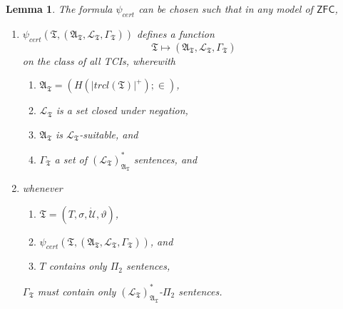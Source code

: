 \documentclass[12pt, twoside]{memoir}
\numberwithin{equation}{section}
\newtheorem{lem}[thm]{Lemma}
\theoremstyle{definition}
\theoremstyle{remark}
\theoremstyle{definition}
\theoremstyle{definition}
\theoremstyle{definition}
\theoremstyle{remark}
\begin{document}
\begin{lem}\label{mcequiv}
The formula $\psi_{cert}$ can be chosen such that in any model of $\mathsf{ZFC}$, 
\begin{enumerate}[label=(\alph*)]
    \item $\psi_{cert}(\mathfrak{T}, (\mathfrak{A}_{\mathfrak{T}}, \mathcal{L}_{\mathfrak{T}}, \Gamma_{\mathfrak{T}}))$ defines a function $$\mathfrak{T} \mapsto (\mathfrak{A}_{\mathfrak{T}}, \mathcal{L}_{\mathfrak{T}}, \Gamma_{\mathfrak{T}})$$ on the class of all TCIs, wherewith
    \begin{enumerate}[label=(\roman*)]
        \item $\mathfrak{A}_{\mathfrak{T}} = (H(|trcl(\mathfrak{T})|^+); \in)$,
        \item $\mathcal{L}_{\mathfrak{T}}$ is a set closed under negation, 
        \item $\mathfrak{A}_{\mathfrak{T}}$ is $\mathcal{L}_{\mathfrak{T}}$-suitable, and
        \item $\Gamma_{\mathfrak{T}}$ a set of $({\mathcal{L}_{\mathfrak{T}}})^*_{\mathfrak{A}_{\mathfrak{T}}}$ sentences, and
    \end{enumerate}
    \item whenever
    \begin{enumerate}[label=(\roman*)]
        \item $\mathfrak{T} = (T, \sigma, \dot{\mathcal{U}}, \vartheta)$, 
        \item $\psi_{cert}(\mathfrak{T}, (\mathfrak{A}_{\mathfrak{T}}, \mathcal{L}_{\mathfrak{T}}, \Gamma_{\mathfrak{T}}))$, and
        \item $T$ contains only $\Pi_2$ sentences, 
    \end{enumerate} 
    $\Gamma_{\mathfrak{T}}$ must contain only $({\mathcal{L}_{\mathfrak{T}}})^{*}_{\mathfrak{A}_{\mathfrak{T}}}$-$\Pi_2$ sentences.
\end{enumerate}
\end{lem}
\end{document}
